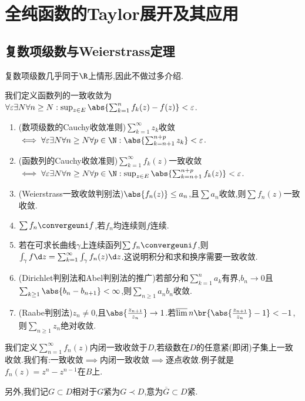 \documentclass{article}
\begin{document}
\section{全纯函数的Taylor展开及其应用}
\subsection{复数项级数与Weierstrass定理}
复数项级数几乎同于$\R$上情形,因此不做过多介绍.

我们定义函数列的一致收敛为$\forall \varepsilon\exists N\forall n\geq N:\sup_{z\in E}\abs{\sum_{k=1}^nf_k(z)-f(z)}<\varepsilon$.

\begin{enumerate}
    \item (数项级数的Cauchy收敛准则)$\sum_{k=1}^\infty z_k$收敛$\iff \forall \varepsilon\exists N\forall n\geq N\forall p\in \N:\abs{\sum_{k=n+1}^{n+p}z_k}<\varepsilon$.
    \item (函数列的Cauchy收敛准则)$\sum_{k=1}^\infty f_k(z)$一致收敛$\iff\forall \varepsilon\exists N\forall n\geq N\forall p\in \N:\sup_{z\in E}\abs{\sum_{k=n+1}^{n+p}f_k(z)}<\varepsilon$.
    \item (Weierstrass一致收敛判别法)$\abs{f_n(z)}\leq a_n$,且$\sum a_n$收敛,则$\sum f_n(z)$一致收敛.
    \item $\sum f_n\convergeuni f$,若$f_n$均连续则$f$连续.
    \item 若在可求长曲线$\gamma$上连续函列$\sum f_n\convergeuni f$,则$\int_\gamma f\d z=\sum_{k=1}^\infty \int_\gamma f_n(z)\d z$.这说明积分和求和换序需要一致收敛.
    \item (Dirichlet判别法和Abel判别法的推广)若部分和$\sum_{k=1}^n a_k$有界,$b_n\to 0$且$\sum_{k\geq 1}\abs{b_n-b_{n+1}}<\infty$,则$\sum_{n\geq 1}a_nb_n$收敛.
    \item (Raabe判别法)$z_n\neq 0$,且$\abs{\frac{z_{n+1}}{z_n}}\to 1$.若$\varlimsup n\br{\abs{\frac{z_{n+1}}{z_n}}-1}<-1$,则$\sum_{n\geq 1}z_n$绝对收敛.
\end{enumerate}

我们定义$\sum_{n=1}^\infty f_n(z)$内闭一致收敛于$D$,若级数在$D$的任意紧(即闭)子集上一致收敛.我们有:一致收敛$\implies$内闭一致收敛$\implies$逐点收敛.例子就是$f_n(z)=z^n-z^{n-1}$在$B$上.

另外,我们记$G\subset D$相对于$G$紧为$G\prec D$,意为$\overline{G}\subset D$紧.
\end{document}
